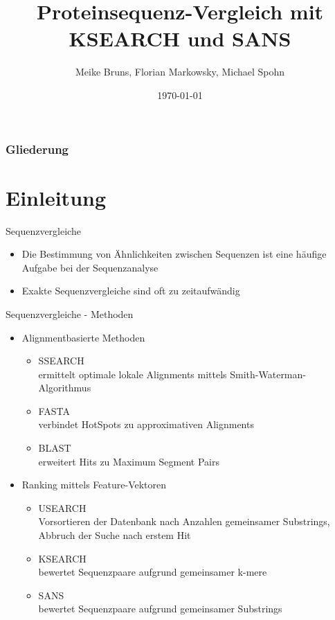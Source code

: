 \documentclass[xcolor=dvipsnames, aspectratio=1610]{beamer}
\author{Meike Bruns, Florian Markowsky, Michael Spohn}
\title{Proteinsequenz-Vergleich mit KSEARCH und SANS}
\date{\today}
\begin{document}
\maketitle

\begin{frame}
	\frametitle{Gliederung}
	\tableofcontents
\end{frame}

\section{Einleitung}

\begin{frame}{Sequenzvergleiche}
  \begin{itemize}
    \item Die Bestimmung von Ähnlichkeiten zwischen Sequenzen ist eine häufige Aufgabe bei der Sequenzanalyse 
    \item Exakte Sequenzvergleiche sind oft zu zeitaufwändig 
  \end{itemize}
\end{frame}

\begin{frame}{Sequenzvergleiche - Methoden}
  \begin{itemize}
    \item Alignmentbasierte Methoden
      \begin{itemize}
        \item SSEARCH\\
              \scriptsize ermittelt optimale lokale Alignments mittels Smith-Waterman-Algorithmus                 
        \item \normalsize FASTA\\
              \scriptsize verbindet HotSpots zu approximativen Alignments            
        \item \normalsize BLAST\\
              \scriptsize erweitert Hits zu Maximum Segment Pairs
       \end{itemize}
    \item \normalsize Ranking mittels Feature-Vektoren
      \begin{itemize}
        \item USEARCH\\
              \scriptsize Vorsortieren der Datenbank nach Anzahlen gemeinsamer Substrings, Abbruch der Suche nach erstem    Hit

        \item \normalsize KSEARCH \\
              \scriptsize bewertet Sequenzpaare aufgrund gemeinsamer k-mere
        \item \normalsize SANS\\
              \scriptsize bewertet Sequenzpaare aufgrund gemeinsamer Substrings
      \end{itemize}
  \end{itemize}
\end{frame}
\end{document}
